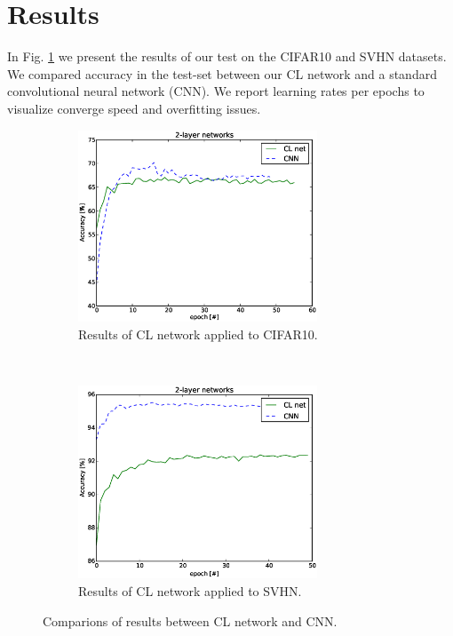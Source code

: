 \documentclass{article} %
\begin{document}



\section{Results}
\label{sec-results}

In Fig. \ref{fig-results1} we present the results of our test on the CIFAR10 and SVHN datasets. We compared accuracy in the test-set between our CL network and a standard convolutional neural network (CNN). We report learning rates per epochs to visualize converge speed and overfitting issues.

\begin{figure}
        \centering
        \begin{subfigure}[b]{0.5\textwidth}
                \centering
                \includegraphics[width=2.8in]{fig-cifar10-clnet.eps}
                \caption{Results of CL network applied to CIFAR10.}
        \end{subfigure}%
        ~%
        \begin{subfigure}[b]{0.5\textwidth}
                \centering
                \includegraphics[width=2.8in]{fig-svhn-clnet.eps}
                \caption{Results of CL network applied to SVHN.}
        \end{subfigure}
        \caption{Comparions of results between CL network and CNN.}
        \label{fig-results1}
\end{figure}
\end{document}
